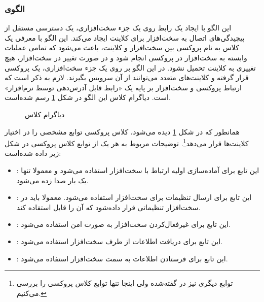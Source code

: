 \subsubsection{الگوی }
\label{HWProxySec}
\begin{RTL}
این الگو \cite{ref1} با ایجاد یک رابط روی یک جزء سخت‌افزاری، یک دسترسی
مستقل از پیچیدگی‌های اتصال به سخت‌افزار برای کلاینت ایجاد می‌کند.
این الگو با معرفی یک کلاس به نام پروکسی بین سخت‌افزار و کلاینت،
باعث می‌شود که تمامی عملیات وابسته به سخت‌افزار در پروکسی انجام شود
و در صورت تغییر در سخت‌افزار، هیچ تغییری به کلاینت تحمیل نشود.
در این الگو بر روی یک جزء سخت‌افزاری، یک پروکسی قرار گرفته و
کلاینت‌های متعدد می‌توانند از آن سرویس بگیرند. لازم به ذکر است که ارتباط پروکسی
و سخت‌افزار بر پایه یک «رابط قابل آدرس‌دهی توسط نرم‌افزار» است. 
دیاگرام کلاس این الگو در شکل \ref{HWProxyClassDiag} رسم شده‌است.
\end{RTL}
\begin{figure}[h!]
\centering
{}
\caption{دیاگرام کلاس }
\label{HWProxyClassDiag}
\end{figure}
\begin{RTL}
همانطور که در شکل \ref{HWProxyClassDiag} دیده می‌شود، کلاس پروکسی توابع
مشخصی را در اختیار کلاینت‌ها قرار می‌دهد\footnote{توابع دیگری نیز در \cite{ref1}
گفته‌شده ولی اینجا تنها توابع  کلاس پروکسی را بررسی می‌کنیم.}.
توضیحات مربوط به هر یک از توابع کلاس پروکسی در شکل زیر داده شده‌است:
\begin{itemize}
  \item {}:
  این تابع برای آماده‌سازی اولیه ارتباط با سخت‌افزار استفاده می‌شود و معمولا تنها یک بار
  صدا زده می‌شود.
  \item {}:
  این تابع برای ارسال تنظیمات برای سخت‌افزار استفاده می‌شود. معمولا باید در سخت‌افزار
  تنظیماتی قرار داده‌شود که آن را قابل استفاده کند.
  \item {}:
  این تابع برای غیرفعال‌کردن سخت‌افزار به صورت امن استفاده می‌شود.
  \item {}:
  این تابع برای دریافت اطلاعات از طرف سخت‌افزار استفاده می‌شود.
  \item {}:
  این تابع برای فرستادن اطلاعات به سمت سخت‌افزار استفاده می‌شود.
\end{itemize}
\end{RTL}
